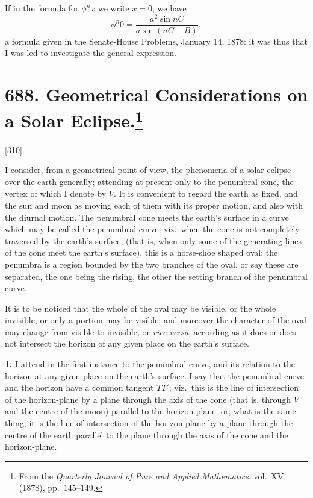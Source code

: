 \documentclass[11pt,a4paper]{book}
\begin{document}
If in the formula for $\phi^n x$ we write $x = 0$, we have
\[
\phi^n 0 = \frac{a^2\sin nC}{a\sin(nC - B)},
\]
a formula given in the Senate-House Problems, January 14, 1878: it was thus that I was led to investigate the general expression.

\newpage
\section[Geometrical Considerations on a Solar Eclipse]{688. Geometrical Considerations on a Solar Eclipse.\footnote{From the \textit{Quarterly Journal of Pure and Applied Mathematics}, vol.\ XV. (1878), pp.\ 145--149.}}

[310]

I consider, from a geometrical point of view, the phenomena of a solar eclipse over the earth generally; attending at present only to the penumbral cone, the vertex of which I denote by $V$. It is convenient to regard the earth as fixed, and the sun and moon as moving each of them with its proper motion, and also with the diurnal motion. The penumbral cone meets the earth's surface in a curve which may be called the penumbral curve; viz.\ when the cone is not completely traversed by the earth's surface, (that is, when only some of the generating lines of the cone meet the earth's surface), this is a horse-shoe shaped oval; the penumbra is a region bounded by the two branches of the oval, or say these are separated, the one being the rising, the other the setting branch of the penumbral curve.

It is to be noticed that the whole of the oval may be visible, or the whole invisible, or only a portion may be visible; and moreover the character of the oval may change from visible to invisible, or \textit{vice vers\^a}, according as it does or does not intersect the horizon of any given place on the earth's surface.

\medskip
\noindent\textbf{1.}\quad
I attend in the first instance to the penumbral curve, and its relation to the horizon at any given place on the earth's surface. I say that the penumbral curve and the horizon have a common tangent $TT'$; viz.\ this is the line of intersection of the horizon-plane by a plane through the axis of the cone (that is, through $V$ and the centre of the moon) parallel to the horizon-plane; or, what is the same thing, it is the line of intersection of the horizon-plane by a plane through the centre of the earth parallel to the plane through the axis of the cone and the horizon-plane.
\end{document}
